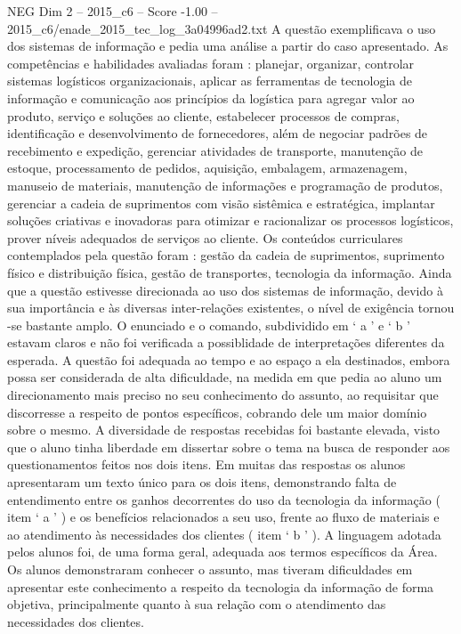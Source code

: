 \begin{textsample}{NEG Dim 2 – 2015\_c6 – Score -1.00 – 2015\_c6/enade\_2015\_tec\_log\_3a04996ad2.txt}
A questão exemplificava o uso dos sistemas de informação e pedia uma análise a partir do caso apresentado.
As competências e habilidades avaliadas foram : planejar, organizar, controlar sistemas logísticos organizacionais, aplicar as ferramentas de tecnologia de informação e comunicação aos princípios da logística para agregar valor ao produto, serviço e soluções ao cliente, estabelecer processos de compras, identificação e desenvolvimento de fornecedores, além de negociar padrões de recebimento e expedição, gerenciar atividades de transporte, manutenção de estoque, processamento de pedidos, aquisição, embalagem, armazenagem, manuseio de materiais, manutenção de informações e programação de produtos, gerenciar a cadeia de suprimentos com visão sistêmica e estratégica, implantar soluções criativas e inovadoras para otimizar e racionalizar os processos logísticos, prover níveis adequados de serviços ao cliente.
Os conteúdos curriculares contemplados pela questão foram : gestão da cadeia de suprimentos, suprimento físico e distribuição física, gestão de transportes, tecnologia da informação.
Ainda que a questão estivesse direcionada ao uso dos sistemas de informação, devido à sua importância e às diversas inter-relações existentes, o nível de exigência tornou -se bastante amplo.
O enunciado e o comando, subdividido em ‘ a ’ e ‘ b ’ estavam claros e não foi verificada a possiblidade de interpretações diferentes da esperada.
A questão foi adequada ao tempo e ao espaço a ela destinados, embora possa ser considerada de alta dificuldade, na medida em que pedia ao aluno um direcionamento mais preciso no seu conhecimento do assunto, ao requisitar que discorresse a respeito de pontos específicos, cobrando dele um maior domínio sobre o mesmo.
A diversidade de respostas recebidas foi bastante elevada, visto que o aluno tinha liberdade em dissertar sobre o tema na busca de responder aos questionamentos feitos nos dois itens.
Em muitas das respostas os alunos apresentaram um texto único para os dois itens, demonstrando falta de entendimento entre os ganhos decorrentes do uso da tecnologia da informação ( item ‘ a ’ ) e os benefícios relacionados a seu uso, frente ao fluxo de materiais e ao atendimento às necessidades dos clientes ( item ‘ b ’ ).
A linguagem adotada pelos alunos foi, de uma forma geral, adequada aos termos específicos da Área.
Os alunos demonstraram conhecer o assunto, mas tiveram dificuldades em apresentar este conhecimento a respeito da tecnologia da informação de forma objetiva, principalmente quanto à sua relação com o atendimento das necessidades dos clientes.

\end{textsample}
